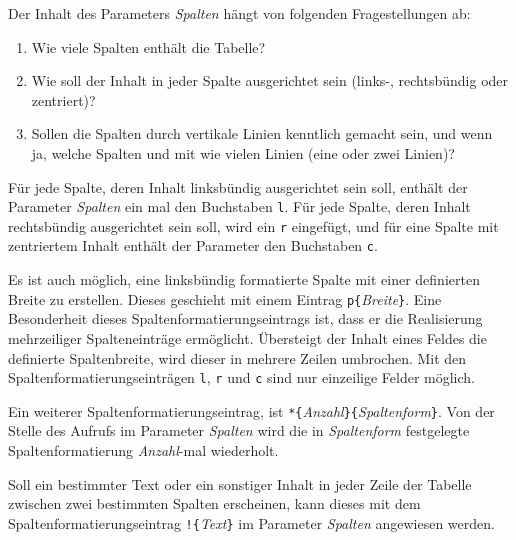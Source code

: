 Der Inhalt des Parameters \textsl{Spalten} hängt von 
folgenden Fragestellungen ab:

\begin{enumerate}
\item Wie viele Spalten enthält die Tabelle?
\item Wie soll der Inhalt in jeder Spalte ausgerichtet sein (links-,
rechtsbündig oder zentriert)?
\item Sollen die Spalten durch vertikale Linien kenntlich gemacht sein, und
wenn ja, welche Spalten und mit wie vielen Linien (eine oder zwei Linien)?
\end{enumerate}



Für jede Spalte, deren Inhalt 
linksbündig ausgerichtet sein soll,
enthält der Parameter \textsl{Spalten} ein mal den Buchstaben \verb!l!. 
Für jede Spalte, deren Inhalt rechtsbündig
ausgerichtet sein soll, wird ein \verb!r! eingefügt, und für eine Spalte
mit zentriertem Inhalt 
enthält der Parameter den Buchstaben \verb!c!.

Es ist auch möglich, eine linksbündig formatierte Spalte mit einer 
definierten Breite zu erstellen. Dieses geschieht mit einem Eintrag
\verb!p{!\textsl{Breite}\verb!}!. Eine Besonderheit dieses 
Spaltenformatierungseintrags ist, dass er die Realisierung mehrzeiliger
Spalteneinträge ermöglicht. Übersteigt der Inhalt eines Feldes die  
definierte Spaltenbreite, wird dieser in mehrere Zeilen umbrochen.
Mit den Spaltenformatierungseinträgen \verb!l!, \verb!r! und \verb!c! 
sind nur einzeilige Felder möglich.

Ein weiterer Spaltenformatierungseintrag,
ist \verb!*{!\textsl{Anzahl}\verb!}{!\textsl{Spaltenform}\verb!}!.
Von der Stelle des Aufrufs im Parameter \textsl{Spalten}
wird die in \textsl{Spaltenform} festgelegte Spaltenformatierung
\textsl{Anzahl}-mal wiederholt.

Soll ein bestimmter Text oder ein sonstiger Inhalt in jeder 
Zeile der Tabelle zwischen zwei bestimmten Spalten erscheinen, kann dieses
mit dem Spaltenformatierungseintrag \texttt{!\{}\textsl{Text}\texttt{\}}
im Parameter \textsl{Spalten} angewiesen werden.

